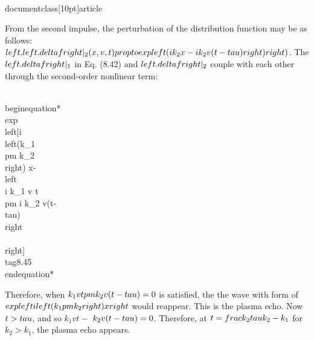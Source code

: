 \\documentclass[10pt]{article}
\begin{document}
{{{{{From the second impulse, the perturbation of the distribution function may be as follows: $\\left.\\left.\\delta f\\right|_{2}(x, v, t) \\propto \\exp \\left(i k_{2} x-i k_{2} v(t-\\tau)\\right)\\right)$. The $\\left.\\delta f\\right|_{1}$ in Eq. (8.42) and $\\left.\\delta f\\right|_{2}$ couple with each other through the second-order nonlinear term:


\\begin{equation*}
\\exp \\left[i\\left(k_{1} \\pm k_{2}\\right) x-\\left\\{i k_{1} v t \\pm i k_{2} v(t-\\tau)\\right\\}\\right] \\tag{8.45}
\\end{equation*}


Therefore, when $k_{1} v t \\pm k_{2} v(t-\\tau)=0$ is satisfied, the the wave with form of $\\exp \\left\\{i\\left(k_{1} \\pm k_{2}\\right) x\\right\\}$ would reappear. This is the plasma echo. Now $t>\\tau$, and so $k_{1} v t-$ $k_{2} v(t-\\tau)=0$. Therefore, at $t=\\frac{k_{2} \\tau}{k_{2}-k_{1}}$ for $k_{2}>k_{1}$, the plasma echo appears.

}}}}}
\end{document}
